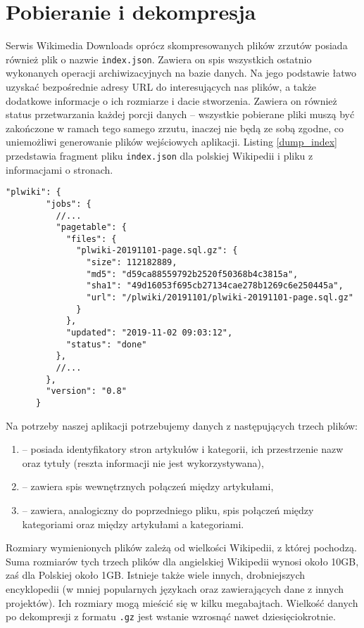 \section{Pobieranie i dekompresja}
Serwis Wikimedia Downloads oprócz skompresowanych plików zrzutów posiada również plik o nazwie \lstinline!index.json!. Zawiera on spis wszystkich ostatnio wykonanych operacji archiwizacyjnych na bazie danych. Na jego podstawie łatwo uzyskać bezpośrednie adresy URL do interesujących nas plików, a także dodatkowe informacje o ich rozmiarze i dacie stworzenia. Zawiera on również status przetwarzania każdej porcji danych – wszystkie pobierane pliki muszą być zakończone w ramach tego samego zrzutu, inaczej nie będą ze sobą zgodne, co uniemożliwi generowanie plików wejściowych aplikacji. Listing \ref{dump_index} przedstawia fragment pliku \lstinline!index.json! dla polskiej Wikipedii i pliku z informacjami o stronach.

\begin{lstlisting}[frame=single,caption={Fragment informacji o ostatnim zrzucie bazy danych polskiej Wikipedii},label=dump_index]
    "plwiki": {
        "jobs": {
          //...
          "pagetable": {
            "files": {
              "plwiki-20191101-page.sql.gz": {
                "size": 112182889,
                "md5": "d59ca88559792b2520f50368b4c3815a",
                "sha1": "49d16053f695cb27134cae278b1269c6e250445a",
                "url": "/plwiki/20191101/plwiki-20191101-page.sql.gz"
              }
            },
            "updated": "2019-11-02 09:03:12",
            "status": "done"
          },
          //...
        },
        "version": "0.8"
      }      
\end{lstlisting}

Na potrzeby naszej aplikacji potrzebujemy danych z następujących trzech plików:

\begin{enumerate}[label=\textbullet]
    \item[\lstinline!page.sql.gz!] – posiada identyfikatory stron artykułów i kategorii, ich przestrzenie nazw oraz tytuły (reszta informacji nie jest wykorzystywana),
    \item[\lstinline!pagelinks.sql.gz!] – zawiera spis wewnętrznych połączeń między artykułami,
    \item[\lstinline!categorylinks.sql.gz!] – zawiera, analogiczny do poprzedniego pliku, spis połączeń między kategoriami oraz między artykułami a kategoriami.
\end{enumerate}

Rozmiary wymienionych plików zależą od wielkości Wikipedii, z której pochodzą. Suma rozmiarów tych trzech plików dla angielskiej Wikipedii wynosi około 10GB, zaś dla Polskiej około 1GB. Istnieje także wiele innych, drobniejszych encyklopedii (w mniej popularnych językach oraz zawierających dane z innych projektów). Ich rozmiary mogą mieścić się w kilku megabajtach. Wielkość danych po dekompresji z formatu \lstinline!.gz! jest wstanie wzrosnąć nawet dziesięciokrotnie.